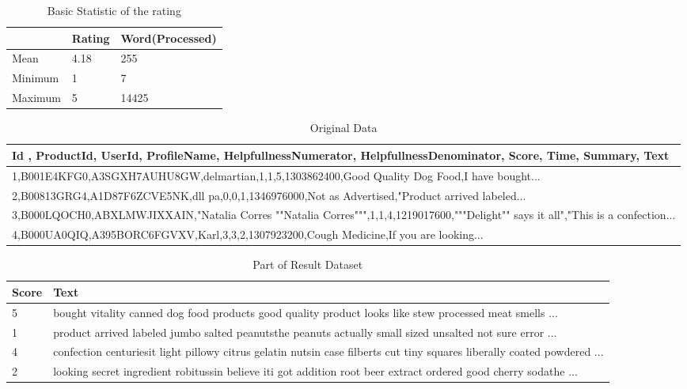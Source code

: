 \begin{table}[H]
  \caption{Basic Statistic of the rating}
  \label{tab:commands}
\begin{tabular}{lll}
	\hline
	    					& Rating 	& Word(Processed)\\
	\hline
	Mean					& 4.18 		& 255\\
	Minimum       		& 1 			& 7\\
	Maximum       		& 5 			& 14425\\
	\hline
\end{tabular}
\end{table}

\begin{table*}
  \caption{Original Data}
  \label{tab:commands}
  \begin{tabular}{l}
    \toprule
    Id , ProductId, UserId, ProfileName, HelpfullnessNumerator, HelpfullnessDenominator, Score, Time, Summary, Text\\
    \midrule
    1,B001E4KFG0,A3SGXH7AUHU8GW,delmartian,1,1,5,1303862400,Good Quality Dog Food,I have bought... \\
    2,B00813GRG4,A1D87F6ZCVE5NK,dll pa,0,0,1,1346976000,Not as Advertised,"Product arrived labeled...\\
    3,B000LQOCH0,ABXLMWJIXXAIN,"Natalia Corres ""Natalia Corres""",1,1,4,1219017600,"""Delight"" says it all","This is a confection...\\
    4,B000UA0QIQ,A395BORC6FGVXV,Karl,3,3,2,1307923200,Cough Medicine,If you are looking... \\
    \bottomrule
  \end{tabular}
\end{table*}

\begin{table*}
  \caption{Part of Result Dataset}
  \label{tab:commands}
  \begin{tabular}{ll}
    \toprule
    Score & Text\\
    \midrule
	5 & bought vitality canned dog food products good quality product looks like stew processed meat smells ... \\ 
	1 & product arrived labeled jumbo salted peanutsthe peanuts actually small sized unsalted not sure error  ... \\ 
	4 & confection centuriesit light pillowy citrus gelatin nutsin case filberts cut tiny squares liberally coated powdered  ...\\ 
	2 & looking secret ingredient robitussin believe iti got addition root beer extract ordered good cherry sodathe  ... \\ 
	\bottomrule
  \end{tabular}
\end{table*}

